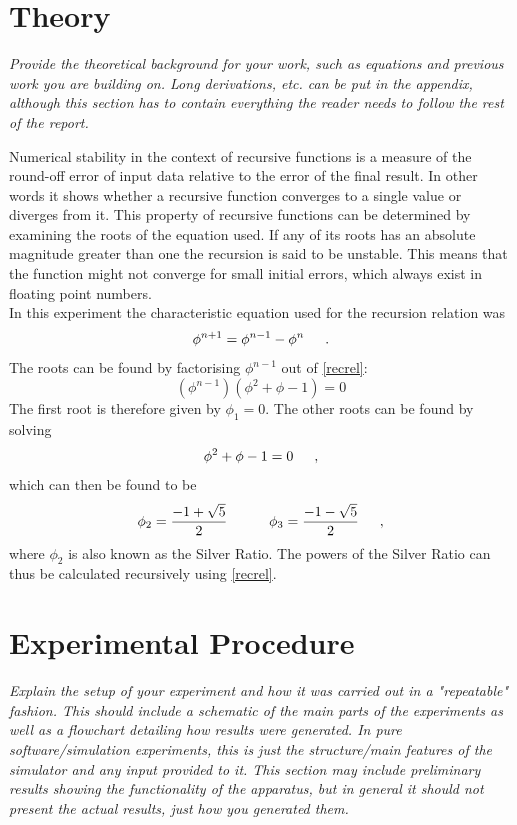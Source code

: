 \documentclass[letterpaper,12pt]{article}
\begin{document}
	\section{Theory}
		\textit{Provide the theoretical background for your work, such as equations and previous work you are building on. Long derivations, etc. can be put in the appendix, although this section has to contain everything the reader needs to follow the rest of the report.}
		
		Numerical stability in the context of recursive functions is a measure of the round-off error of input data relative to the error of the final result. In other words it shows whether a recursive function converges to a single value or diverges from it. This property of recursive functions can be determined by examining the roots of the equation used. If any of its roots has an absolute magnitude greater than one the recursion is said to be unstable. This means that the function might not converge for small initial errors, which always exist in floating point numbers.\\
		
		In this experiment the characteristic equation used for the recursion relation was
		\begin{equation}
		\phi^{n+1} = \phi^{n-1} - \phi^{n} \indent . \label{recrel}
		\end{equation}
		The roots can be found by factorising $\phi^{n-1}$ out of \cref{recrel}:
		\begin{equation}
		(\phi^{n-1})(\phi^{2} + \phi -1) = 0
		\end{equation}
		The first root is therefore given by $\phi_{1}=0$. The other roots can be found by solving
		\begin{equation}
		\phi^{2} + \phi -1 = 0 \indent , \label{chareq}
		\end{equation}
		which can then be found to be
		$$\phi_{2}=\frac{-1+\sqrt{5}}{2} \indent\indent 
		\phi_{3}=\frac{-1-\sqrt{5}}{2} \indent ,$$
		where $\phi_2$ is also known as the Silver Ratio. The powers of the Silver Ratio can thus be calculated recursively using \cref{recrel}.
		
	\section{Experimental Procedure}
		\textit{Explain the setup of your experiment and how it was carried out in a "repeatable" fashion. This should include a schematic of the main parts of the experiments as well as a flowchart detailing how results were generated. In pure software/simulation experiments, this is just the structure/main features of the simulator and any input provided to it. This section may include preliminary results showing the functionality of the apparatus, but in general it should not present the actual results, just how you generated them.}
	
\end{document}
